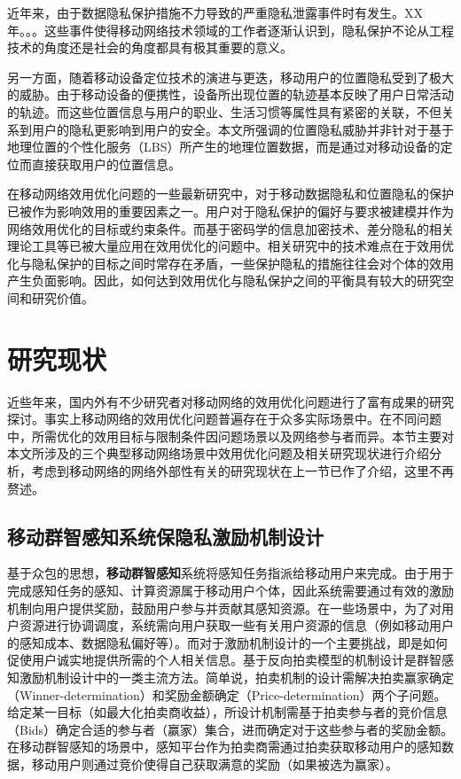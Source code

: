 近年来，由于数据隐私保护措施不力导致的严重隐私泄露事件时有发生。XX年。。。这些事件使得移动网络技术领域的工作者逐渐认识到，隐私保护不论从工程技术的角度还是社会的角度都具有极其重要的意义。



另一方面，随着移动设备定位技术的演进与更迭，移动用户的位置隐私受到了极大的威胁。由于移动设备的便携性，设备所出现位置的轨迹基本反映了用户日常活动的轨迹。而这些位置信息与用户的职业、生活习惯等属性具有紧密的关联，不但关系到用户的隐私更影响到用户的安全。本文所强调的位置隐私威胁并非针对于基于地理位置的个性化服务（LBS）所产生的地理位置数据，而是通过对移动设备的定位而直接获取用户的位置信息。

在移动网络效用优化问题的一些最新研究中，对于移动数据隐私和位置隐私的保护已被作为影响效用的重要因素之一。用户对于隐私保护的偏好与要求被建模并作为网络效用优化的目标或约束条件。而基于密码学的信息加密技术、差分隐私\cite{}的相关理论工具等已被大量应用在效用优化的问题中。相关研究中的技术难点在于效用优化与隐私保护的目标之间时常存在矛盾，一些保护隐私的措施往往会对个体的效用产生负面影响。因此，如何达到效用优化与隐私保护之间的平衡具有较大的研究空间和研究价值。


\fi

\section{研究现状}

近些年来，国内外有不少研究者对移动网络的效用优化问题进行了富有成果的研究探讨。事实上移动网络的效用优化问题普遍存在于众多实际场景中。在不同问题中，所需优化的效用目标与限制条件因问题场景以及网络参与者而异。本节主要对本文所涉及的三个典型移动网络场景中效用优化问题及相关研究现状进行介绍分析，考虑到移动网络的网络外部性有关的研究现状在上一节已作了介绍，这里不再赘述。

\subsection{移动群智感知系统保隐私激励机制设计}

基于众包的思想，{\kaishu\bfseries 移动群智感知}系统将感知任务指派给移动用户来完成。由于用于完成感知任务的感知、计算资源属于移动用户个体，因此系统需要通过有效的激励机制向用户提供奖励，鼓励用户参与并贡献其感知资源。在一些场景中，为了对用户资源进行协调调度，系统需向用户获取一些有关用户资源的信息（例如移动用户的感知成本、数据隐私偏好等）。而对于激励机制设计的一个主要挑战，即是如何促使用户诚实地提供所需的个人相关信息。基于反向拍卖模型的机制设计是群智感知激励机制设计中的一类主流方法\cite{yang2012crowdsourcing}。简单说，拍卖机制的设计需解决拍卖赢家确定（Winner-determination）和奖励金额确定（Price-determination）两个子问题。给定某一目标（如最大化拍卖商收益），所设计机制需基于拍卖参与者的竞价信息（Bids）确定合适的参与者（赢家）集合，进而确定对于这些参与者的奖励金额。在移动群智感知的场景中，感知平台作为拍卖商需通过拍卖获取移动用户的感知数据，移动用户则通过竞价使得自己获取满意的奖励（如果被选为赢家）。

